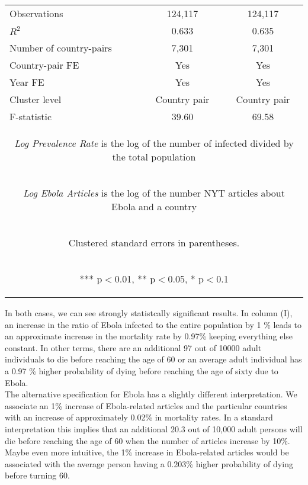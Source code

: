 \documentclass{article}
\begin{document}
\begin{center}
\begin{table}[htbp]
\begin{tabular}{lcc}
Observations & 124,117 & 124,117 \\
$R^2$ & 0.633 & 0.635 \\
Number of country-pairs & 7,301 & 7,301 \\
Country-pair FE & Yes & Yes \\
Year FE & Yes & Yes \\
Cluster level & Country pair & Country pair \\
F-statistic & 39.60 & 69.58 \\ \hline
\multicolumn{3}{c}{\begin{footnotesize} \textit{Log Prevalence Rate} is the log of the number of infected divided by the total population \end{footnotesize} }\\
\multicolumn{3}{c}{\begin{footnotesize} \textit{Log Ebola Articles} is the log of the number NYT articles about Ebola and a country \end{footnotesize} }\\
\multicolumn{3}{c}{\begin{footnotesize} Clustered standard errors in parentheses. \end{footnotesize} }\\
\multicolumn{3}{c}{\begin{footnotesize} *** p$<$0.01, ** p$<$0.05, * p$<$0.1\end{footnotesize}} \\
\end{tabular}
\end{table}
\end{center}
In both cases, we can see strongly statistcally significant results. In column (I), an increase in the ratio of Ebola infected to the entire population by 1 \% leads to an approximate increase in the mortality rate by 0.97\% keeping everything else constant. In other terms, there are an additional 97 out of 10000 adult individuals to die before reaching the age of 60 or an average adult individual has a 0.97 \% higher probability of dying before reaching the age of sixty due to Ebola. \\
The alternative specification for Ebola has a slightly different interpretation. We associate an 1\% increase of Ebola-related articles and the particular countries with an increase of approximately 0.02\% in mortality rates. In a standard interpretation this implies that an additional 20.3 out of 10,000 adult persons will die before reaching the age of 60 when the number of articles increase by 10\%. Maybe even more intuitive, the 1\% increase in Ebola-related articles would be associated with the average person having a 0.203\% higher probability of dying before turning 60. \\
\end{document}
